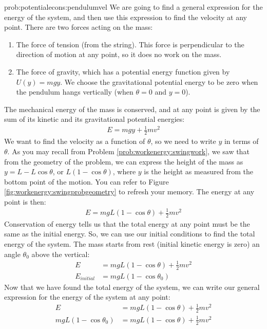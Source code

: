 \begin{solution}{prob:potentialecons:pendulumvel}\label{soln:potentialecons:pendulumvel}
We are going to find a general expression for the energy of the system, and then use this expression to find the velocity at any point. There are two forces acting on the mass:
\begin{enumerate}
\item The force of tension (from the string). This force is perpendicular to the direction of motion at any point, so it does no work on the mass. 
\item The force of gravity, which has a potential energy function given by $U(y)=mgy$. We choose the gravitational potential energy to be zero when the pendulum hangs vertically (when $\theta=0$ and $y=0$). 
\end{enumerate}
The mechanical energy of the mass is conserved, and at any point is given by the sum of its kinetic and its gravitational potential energies:
\begin{align*}
E=mgy+\frac{1}{2}mv^2
\end{align*}
We want to find the velocity as a function of $\theta$, so we need to write $y$ in terms of $\theta$. As you may recall from Problem \ref{prob:workenergy:swingwork}, we saw that from the geometry of the problem, we can express the height of the mass as $y=L-L\cos\theta$, or $L(1-\cos\theta)$, where $y$ is the height as measured from the bottom point of the motion. You can refer to Figure \ref{fig:workenergy:swingprobgeometry} to refresh your memory. The energy at any point is then:
\begin{align*}
E=mgL(1-\cos\theta)+\frac{1}{2}mv^2
\end{align*}
Conservation of energy tells us that the total energy at any point must be the same as the initial energy. So, we can use our initial conditions to find the total energy of the system. The mass starts from rest (initial kinetic energy is zero) an angle $\theta_0$ above the vertical:
\begin{align*}
E&=mgL(1-\cos\theta)+\frac{1}{2}mv^2\\
E_{initial}&=mgL(1-\cos\theta_0)
\end{align*} 
Now that we have found the total energy of the system, we can write our general expression for the energy of the system at any point:
\begin{align*}
E&=mgL(1-\cos\theta)+\frac{1}{2}mv^2\\
mgL(1-\cos\theta_0)&=mgL(1-\cos\theta)+\frac{1}{2}mv^2
\end{align*}

\end{solution}
